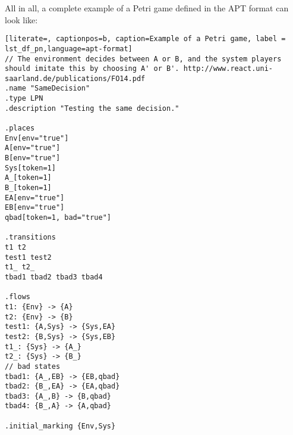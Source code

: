 All in all, a complete example of a Petri game defined in the APT format can look like:


\begin{lstlisting}[literate=, captionpos=b, caption=Example of a Petri game, label = lst_df_pn,language=apt-format]
// The environment decides between A or B, and the system players should imitate this by choosing A' or B'. http://www.react.uni-saarland.de/publications/FO14.pdf
.name "SameDecision"
.type LPN
.description "Testing the same decision."

.places
Env[env="true"]
A[env="true"]
B[env="true"]
Sys[token=1]
A_[token=1]
B_[token=1]
EA[env="true"]
EB[env="true"]
qbad[token=1, bad="true"]

.transitions
t1 t2
test1 test2
t1_ t2_
tbad1 tbad2 tbad3 tbad4

.flows
t1: {Env} -> {A}
t2: {Env} -> {B}
test1: {A,Sys} -> {Sys,EA}
test2: {B,Sys} -> {Sys,EB}
t1_: {Sys} -> {A_}
t2_: {Sys} -> {B_}
// bad states
tbad1: {A_,EB} -> {EB,qbad}
tbad2: {B_,EA} -> {EA,qbad}
tbad3: {A_,B} -> {B,qbad}
tbad4: {B_,A} -> {A,qbad}

.initial_marking {Env,Sys}
\end{lstlisting}


